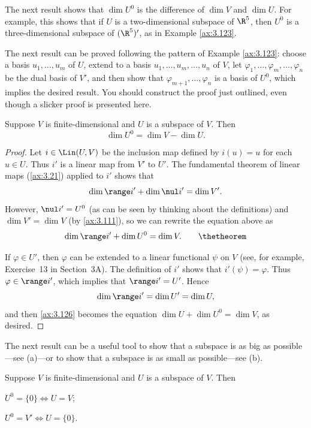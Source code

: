 The next result shows that $\dim U^0$ is the difference of $\dim V$ and
$\dim U$. For example, this shows that if $U$ is a two-dimensional subspace of
$\R^5$, then $U^0$ is a three-dimensional subspace of $(\R^5)'$, as in Example
\ref{ax:3.123}.

The next result can be proved following the pattern of Example \ref{ax:3.123}:
choose a basis $u_1,\dots,u_m$ of $U$, extend to a basis
$u_1,\dots,u_m,\dots,u_n$ of $V$, let $\varphi_1,\dots,\varphi_m,\dots,\varphi_n$
be the dual basis of $V'$, and then show that $\varphi_{m+1},\dots,\varphi_n$ is
a basis of $U^0$, which implies the desired result. You should construct the
proof just outlined, even though a slicker proof is presented here.

\begin{result}\label{ax:3.125}
Suppose $V$ is finite-dimensional and $U$ is a subspace of $V$. Then
\[ \dim U^0 = \dim V-\dim U. \]
\end{result}

\begin{proof}
Let $i\in\Lin(U,V)$ be the inclusion map defined by $i(u)=u$ for each $u\in U$.
Thus $i'$ is a linear map from $V'$ to $U'$. The fundamental theorem of linear
maps (\ref{ax:3.21}) applied to $i'$ shows that
\[ \dim\range i'+\dim\nul i' = \dim V'. \]
However, $\nul i'=U^0$ (as can be seen by thinking about the definitions) and
$\dim V'=\dim V$ (by \ref{ax:3.111}), so we can rewrite the equation above
as
\begin{equation*}
\dim\range i'+\dim U^0 = \dim V. \tag*{\thetheorem}\label{ax:3.126}
\end{equation*}

If $\varphi\in U'$, then $\varphi$ can be extended to a linear functional $\psi$
on $V$ (see, for example, Exercise~13 in Section~3A). The definition of $i'$
shows that $i'(\psi)=\varphi$. Thus $\varphi\in\range i'$, which implies that
$\range i'=U'$. Hence
\[ \dim\range i' = \dim U' = \dim U, \]
and then \ref{ax:3.126} becomes the equation $\dim U+\dim U^0=\dim V$, as
desired.
\end{proof}

The next result can be a useful tool to show that a subspace is as big as
possible---see (a)---or to show that a subspace is as small as possible---see
(b).

\begin{result}\label{ax:3.127}
Suppose $V$ is finite-dimensional and $U$ is a subspace of $V$. Then
\begin{parts}
\item $U^0=\{0\}\iff U=V$;
\item $U^0=V'\iff U=\{0\}$.
\end{parts}
\end{result}

